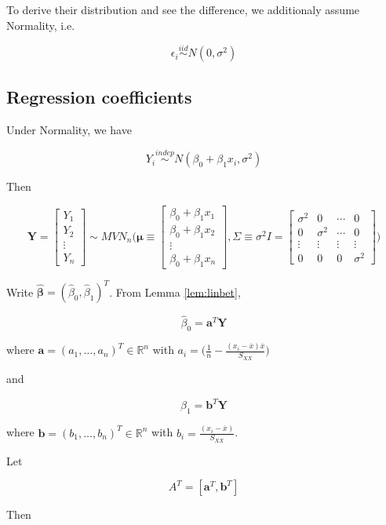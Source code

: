 \documentclass[]{book}
\theoremstyle{definition}
\theoremstyle{definition}
\theoremstyle{definition}
\theoremstyle{remark}
\begin{document}
To derive their distribution and see the difference, we additionaly
assume Normality, i.e.

\[\epsilon_i \stackrel{iid}{\sim} N(0, \sigma^2)\]

\subsection{Regression coefficients}\label{simplebdist}

Under Normality, we have

\[Y_i \stackrel{indep}{\sim} N(\beta_0 + \beta_1 x_i, \sigma^2)\]

Then

\[
\mathbf{Y} = \begin{bmatrix}
  Y_1 \\
  Y_2 \\
  \vdots \\
  Y_n
\end{bmatrix} \sim MVN_n\Bigg( \boldsymbol\mu \equiv \begin{bmatrix}
  \beta_0 + \beta_1 x_1 \\
  \beta_0 + \beta_1 x_2 \\
  \vdots \\
  \beta_0 + \beta_1 x_n
\end{bmatrix}, \Sigma \equiv \sigma^2 I = \begin{bmatrix}
  \sigma^2 & 0 & \cdots & 0 \\
  0 & \sigma^2 & \cdots & 0 \\
  \vdots & \vdots & \vdots & \vdots \\
  0 & 0 & 0 & \sigma^2
\end{bmatrix} \Bigg)
\]

Write \(\boldsymbol{\hat\beta} = (\hat\beta_0, \hat\beta_1)^T\). From
Lemma \ref{lem:linbet},

\[\hat\beta_0 = \mathbf{a}^T\mathbf{Y}\]

where \(\mathbf{a} = (a_1, \ldots, a_n)^T \in \mathbb{R}^n\) with
\(a_i = \bigg( \frac{1}{n} - \frac{(x_i - \overline{x})\overline{x}}{S_{XX}} \bigg)\)

and

\[\hat\beta_1 = \mathbf{b}^T\mathbf{Y}\]

where \(\mathbf{b} = (b_1, \ldots, b_n)^T \in \mathbb{R}^n\) with
\(b_i = \frac{(x_i - \overline{x})}{S_{XX}}\).

Let

\[A^T = [ \mathbf{a}^T, \mathbf{b}^T ]\]

Then
\end{document}
